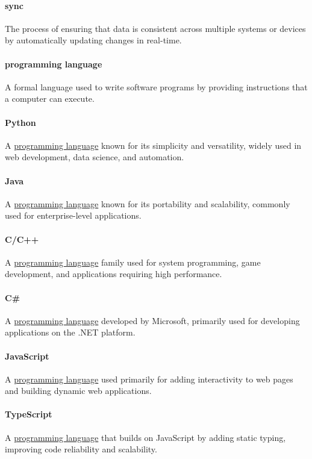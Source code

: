 \documentclass[12pt]{article}
\begin{document}
\paragraph*{sync}
The process of ensuring that data is consistent across multiple systems or devices by automatically updating changes in real-time.

\paragraph*{programming language}
\label{term:progl}
A formal language used to write software programs by providing instructions that a computer can execute.

\paragraph*{Python}
\label{term:python}
A \hyperref[term:progl]{programming language} known for its simplicity and versatility, widely used in web development, data science, and automation.

\paragraph*{Java}
A \hyperref[term:progl]{programming language} known for its portability and scalability, commonly used for enterprise-level applications.

\paragraph*{C/C++}
A \hyperref[term:progl]{programming language} family used for system programming, game development, and applications requiring high performance.

\paragraph*{C\#}
A \hyperref[term:progl]{programming language} developed by Microsoft, primarily used for developing applications on the .NET platform.

\paragraph*{JavaScript}
\label{term:JS}
A \hyperref[term:progl]{programming language} used primarily for adding interactivity to web pages and building dynamic web applications.

\paragraph*{TypeScript}
A \hyperref[term:progl]{programming language} that builds on JavaScript by adding static typing, improving code reliability and scalability.
\end{document}
